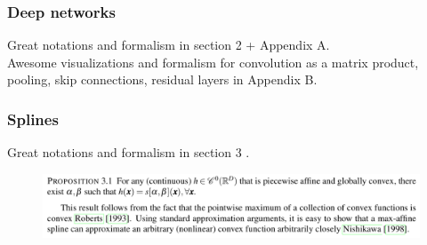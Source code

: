 \documentclass{article}
\begin{document}
\subsubsection{Deep networks}

Great notations and formalism in section 2 + Appendix A.\\
Awesome visualizations and formalism for convolution as a matrix product, pooling, skip connections, residual layers in Appendix B.


\subsubsection{Splines}

Great notations and formalism in section 3 .\\

\begin{figure}[h]
\begin{center}
	\includegraphics[width=.8\linewidth]{Figure/prop1}
	\label{fig:prop1}
\end{center}
\end{figure}




\end{document}
